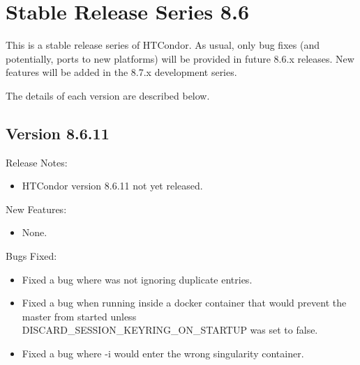
\section{\label{sec:History-8-6}Stable Release Series 8.6}

This is a stable release series of HTCondor.
As usual, only bug fixes (and potentially, ports to new platforms)
will be provided in future 8.6.x releases.
New features will be added in the 8.7.x development series.

The details of each version are described below.

\subsection*{\label{sec:New-8-6-11}Version 8.6.11}

\noindent Release Notes:

\begin{itemize}

\item HTCondor version 8.6.11 not yet released.

\end{itemize}


\noindent New Features:

\begin{itemize}

\item None.

\end{itemize}

\noindent Bugs Fixed:

\begin{itemize}

\item Fixed a bug where  was not ignoring
duplicate entries.

\item Fixed a bug when running inside a docker container that would prevent
the master from started unless DISCARD\_SESSION\_KEYRING\_ON\_STARTUP was set to
false.

\item Fixed a bug where  -i would enter the wrong singularity
container.

\end{itemize}

